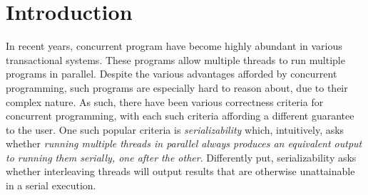 \section{Introduction}
\label{sec:introduction}

%
%
%
%
%

%    
%
%


In recent years, concurrent program have become highly abundant in various transactional systems. These programs allow multiple threads to run multiple programs in parallel.
Despite the various advantages afforded by concurrent programming, such programs are especially hard to reason about, due to their complex nature.
%
As such, there have been various correctness criteria for concurrent programming, with each such criteria affording a different guarantee to the user.
One such popular criteria is \textit{serializability} which, intuitively, asks whether \textit{running multiple threads in parallel always produces an equivalent output to running them serially, one after the other}. Differently put, serializability asks whether interleaving threads will output results that are otherwise unattainable in a serial execution.

